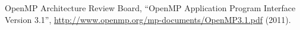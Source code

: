 \documentclass[a4paper,11pt,twoside]{report}
\begin{document}
\cleardoublepage

% 

% 

% 

% 

% 

\begin{thebibliography}{99}
  OpenMP Architecture Review Board,
	 ``OpenMP Application Program Interface Version 3.1'',
	 \url{http://www.openmp.org/mp-documents/OpenMP3.1.pdf}
	 (2011).
\end{thebibliography}

\appendix

\cleardoublepage

% 

% 

% 

% 

\printindex
\end{document}
